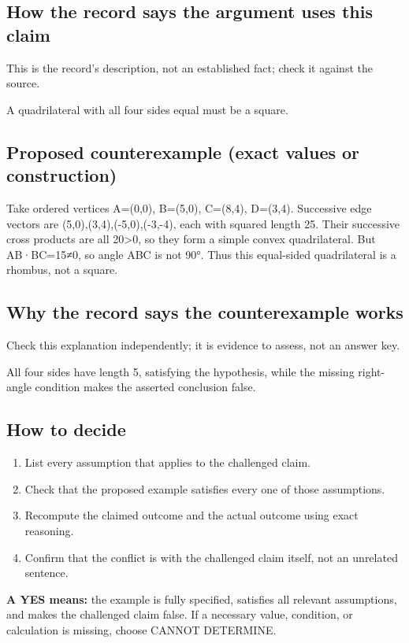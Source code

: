 \documentclass[11pt]{article}
\begin{document}
\subsection*{How the record says the argument uses this claim}
This is the record's description, not an established fact; check it against the source.
\begin{Vsrc}
A quadrilateral with all four sides equal must be a square.
\end{Vsrc}
\subsection*{Proposed counterexample (exact values or construction)}
\begin{Vsrc}
Take ordered vertices A=(0,0), B=(5,0), C=(8,4), D=(3,4). Successive edge vectors are (5,0),(3,4),(-5,0),(-3,-4), each with squared length 25. Their successive cross products are all 20>0, so they form a simple convex quadrilateral. But AB·BC=15≠0, so angle ABC is not 90°. Thus this equal-sided quadrilateral is a rhombus, not a square.
\end{Vsrc}
\subsection*{Why the record says the counterexample works}
Check this explanation independently; it is evidence to assess, not an answer key.
\begin{Vsrc}
All four sides have length 5, satisfying the hypothesis, while the missing right-angle condition makes the asserted conclusion false.
\end{Vsrc}
\subsection*{How to decide}
\begin{enumerate}
\item List every assumption that applies to the challenged claim.
\item Check that the proposed example satisfies every one of those assumptions.
\item Recompute the claimed outcome and the actual outcome using exact reasoning.
\item Confirm that the conflict is with the challenged claim itself, not an unrelated sentence.
\end{enumerate}
\textbf{A YES means:} the example is fully specified, satisfies all relevant assumptions, and makes the challenged claim false. If a necessary value, condition, or calculation is missing, choose CANNOT DETERMINE.
\end{document}
